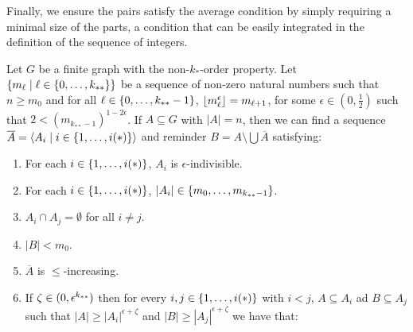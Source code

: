     Finally, we ensure the pairs satisfy the average condition by simply requiring a minimal size of the parts,
    a condition that can be easily integrated in the definition of the sequence of integers.

    \begin{lemma}[Claim 4.10] \label{lem:existance_of_ordered_f_indivisible_partitions_with_exceptions_bound}
        Let $G$ be a finite graph with the non-$k_{*}$-order property.
        Let $\{ m_\ell \mid \ell \in \{ 0, \dots, k_{**} \} \}$ be a sequence of non-zero natural numbers such that
        $n \geq m_0$ and for all $\ell \in \{ 0, \dots, k_{**}-1 \}$, $\left\lfloor m_\ell^\epsilon \right\rfloor = m_{\ell+1}$,
        for some $\epsilon \in (0, \frac{1}{2})$ such that $2 < (m_{k_{**}-1})^{1-2\epsilon}$.
        If $A \subseteq G$ with $|A| = n$, then we can find a sequence $\overline{A} = \left< A_i \mid i \in \{ 1, \dots, i(*) \} \right>$
        and reminder $B = A \setminus \bigcup \overline{A}$ satisfying:
        \begin{enumerate}
            \item \label{itm:existance_of_ordered_f_indivisible_partitions_with_exceptions_bound.1} For each $i \in \{ 1, \dots, i(*) \}$, $A_i$ is $\epsilon$-indivisible.
            \item \label{itm:existance_of_ordered_f_indivisible_partitions_with_exceptions_bound.2} For each $i \in \{ 1, \dots, i(*) \}$, $|A_i| \in \{ m_0, \dots, m_{k_{**}-1} \}$.
            \item \label{itm:existance_of_ordered_f_indivisible_partitions_with_exceptions_bound.3} $A_i \cap A_j = \emptyset$ for all $i \neq j$.
            \item \label{itm:existance_of_ordered_f_indivisible_partitions_with_exceptions_bound.4} $|B| < m_0$.
            \item \label{itm:existance_of_ordered_f_indivisible_partitions_with_exceptions_bound.5} $\overline{A}$ is $\leq$-increasing.
            \item \label{itm:existance_of_ordered_f_indivisible_partitions_with_exceptions_bound.6} If $\zeta \in ( 0,\epsilon^{k_{**}} )$ then for every $i,j \in \{ 1, \dots, i(*) \}$ with $i < j$,
                $A \subseteq A_i$ ad $B \subseteq A_j$ such that $|A| \geq |A_i|^{\epsilon + \zeta}$ and $|B| \geq |A_j|^{\epsilon + \zeta}$
                we have that:
                \[
                    \begin{split}

\end{split}\]
\end{enumerate}
\end{lemma}
